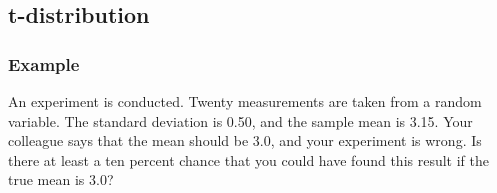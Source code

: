 \subsection{t-distribution}

\begin{frame}
  \frametitle{Example}

  An experiment is conducted. Twenty measurements are taken from a
  random variable. The  standard deviation is 0.50,
  and the sample mean is 3.15. Your colleague says that the mean
  should be 3.0, and your experiment is wrong. Is there at least a ten
  percent chance that you could have found this result
   if the true mean is 3.0?

\end{frame}

